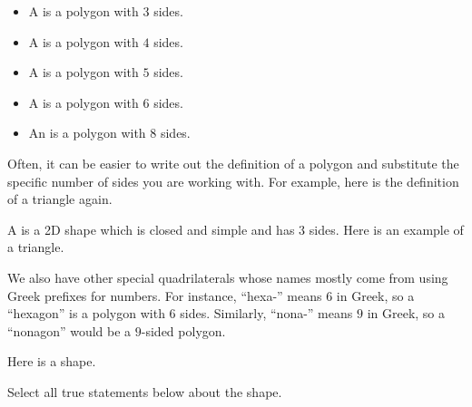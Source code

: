 \documentclass{ximera}
\begin{document}
\begin{definition}
	\begin{itemize}
		\item A  is a polygon with $3$ sides.
		\item A  is a polygon with $4$ sides.
		\item A  is a polygon with $5$ sides.
		\item A  is a polygon with $6$ sides.
		\item An  is a polygon with $8$ sides.
	\end{itemize}
\end{definition}

Often, it can be easier to write out the definition of a polygon and substitute the specific number of sides you are working with. For example, here is the definition of a triangle again.
\begin{definition}
A  is a 2D shape which is closed and simple and has $3$ sides. Here is an example of a triangle.
	\begin{center}
	\end{center}
\end{definition}

We also have other special quadrilaterals whose names mostly come from using Greek prefixes for numbers. For instance, ``hexa-'' means $6$ in Greek, so a ``hexagon'' is a polygon with 6 sides. Similarly, ``nona-'' means $9$ in Greek, so a ``nonagon'' would be a $9$-sided polygon.

\begin{question}
	Here is a shape.
	\begin{center}
	\end{center}
Select all true statements below about the shape.
\begin{selectAll}
\end{selectAll}
\end{question}
\end{document}
